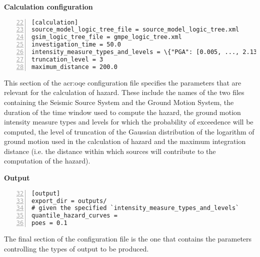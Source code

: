 \textbf{Calculation configuration}
\label{sec:calculation_configuration}

\begin{Verbatim}[frame=single, commandchars=\\\{\}, fontsize=\small,
     firstnumber=22, numbers=left, numbersep=2pt]
[calculation]
source_model_logic_tree_file = source_model_logic_tree.xml
gsim_logic_tree_file = gmpe_logic_tree.xml
investigation_time = 50.0
intensity_measure_types_and_levels = \{"PGA": [0.005, ..., 2.13]\}
truncation_level = 3
maximum_distance = 200.0
\end{Verbatim}

This section of the \gls{acr:oqe} configuration file specifies the parameters
that are relevant for the calculation of hazard. These include the names of
the two files containing the Seismic Source System and the Ground  Motion
System, the duration of the time window used to compute the  hazard, the
ground motion intensity measure types and levels for  which the probability of
exceedence will be computed, the level of truncation of the Gaussian
distribution of the logarithm of ground motion used in the calculation of
hazard and the maximum integration distance (i.e. the distance within which
sources will contribute to the computation of the hazard).


\textbf{Output}

\begin{Verbatim}[frame=single, commandchars=\\\{\}, fontsize=\small,
    firstnumber=32, numbers=left, numbersep=2pt]
[output]
export_dir = outputs/
# given the specified `intensity_measure_types_and_levels`
quantile_hazard_curves =
poes = 0.1
\end{Verbatim}

The final section of the configuration file is the one that contains the
parameters controlling the types of output to be produced.

